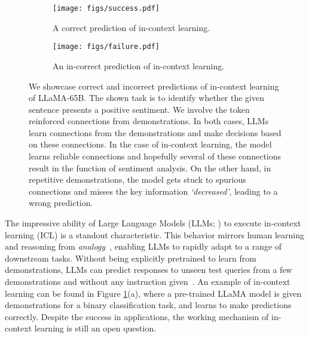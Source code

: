 \documentclass{article} %
\begin{document}
\begin{figure}[h]
  \centering
  
  \begin{subfigure}[b]{0.85\linewidth}
    \centering
    \texttt{[image: figs/success.pdf]}
    \caption{A correct prediction of in-context learning.}
  \end{subfigure}
  \hfill
  \begin{subfigure}[b]{0.85\linewidth}
    \centering
    \texttt{[image: figs/failure.pdf]}
    \caption{An in-correct prediction of in-context learning.}
  \end{subfigure}
  \caption{We showcase correct and incorrect predictions of in-context learning of LLaMA-65B. 
  The shown task is to identify whether the given sentence presents a positive sentiment. 
  We involve the token reinforced connections from demonstrations.
  In both cases, LLMs learn connections from the demonstrations and make decisions based on these connections.
  In the case of in-context learning, the model learns reliable connections and hopefully several of these connections result in the function of sentiment analysis. 
  On the other hand, in repetitive demonstrations, the model gets stuck to spurious connections and misses the key information \emph{`decreased'}, leading to a wrong prediction.
  }
  \vspace{-10pt}
  \label{fig:examples}
\end{figure}

The impressive ability of Large Language Models (LLMs; \citet{touvron2023llama,chowdhery2022palm,openai2023gpt4}) to execute in-context learning (ICL) is a standout characteristic. 
This behavior mirrors human learning and reasoning from \emph{analogy}~\citep{winston1980learning}, enabling LLMs to rapidly adapt to a range of downstream tasks.
Without being explicitly pretrained to learn from demonstrations, LLMs can predict responses to unseen test queries from a few demonstrations and without any instruction given~\citep{brown2020language,zhang2022opt,chowdhery2022palm}. 
An example of in-context learning can be found in Figure \ref{fig:examples}(a), where a pre-trained LLaMA model is given demonstrations for a binary classification task, and learns to make predictions correctly.
Despite the success in applications, the working mechanism of in-context learning is still an open question.
\end{document}
